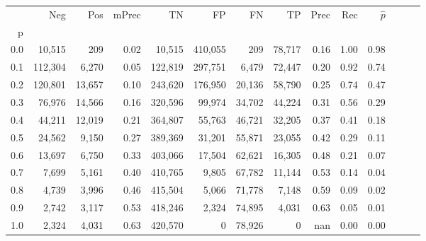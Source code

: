 \begin{tabular}{rrrrrrrrrrrrrr}
\toprule
{} &      Neg &     Pos & mPrec &       TN &       FP &      FN &      TP &  Prec &   Rec & $\hat{p}$ \\
p   &          &         &       &          &          &         &         &       &       &           \\
\midrule
0.0 &   10,515 &     209 &  0.02 &   10,515 &  410,055 &     209 &  78,717 &  0.16 &  1.00 &      0.98 \\
0.1 &  112,304 &   6,270 &  0.05 &  122,819 &  297,751 &   6,479 &  72,447 &  0.20 &  0.92 &      0.74 \\
0.2 &  120,801 &  13,657 &  0.10 &  243,620 &  176,950 &  20,136 &  58,790 &  0.25 &  0.74 &      0.47 \\
0.3 &   76,976 &  14,566 &  0.16 &  320,596 &   99,974 &  34,702 &  44,224 &  0.31 &  0.56 &      0.29 \\
0.4 &   44,211 &  12,019 &  0.21 &  364,807 &   55,763 &  46,721 &  32,205 &  0.37 &  0.41 &      0.18 \\
0.5 &   24,562 &   9,150 &  0.27 &  389,369 &   31,201 &  55,871 &  23,055 &  0.42 &  0.29 &      0.11 \\
0.6 &   13,697 &   6,750 &  0.33 &  403,066 &   17,504 &  62,621 &  16,305 &  0.48 &  0.21 &      0.07 \\
0.7 &    7,699 &   5,161 &  0.40 &  410,765 &    9,805 &  67,782 &  11,144 &  0.53 &  0.14 &      0.04 \\
0.8 &    4,739 &   3,996 &  0.46 &  415,504 &    5,066 &  71,778 &   7,148 &  0.59 &  0.09 &      0.02 \\
0.9 &    2,742 &   3,117 &  0.53 &  418,246 &    2,324 &  74,895 &   4,031 &  0.63 &  0.05 &      0.01 \\
1.0 &    2,324 &   4,031 &  0.63 &  420,570 &        0 &  78,926 &       0 &   nan &  0.00 &      0.00 \\
\bottomrule
\end{tabular}
